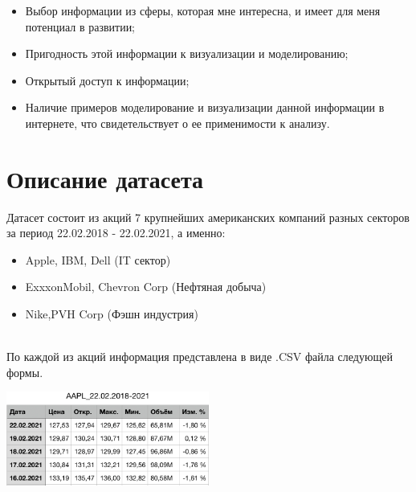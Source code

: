 \documentclass[12pt,a4paper]{article}
\begin{document}
\begin{minipage}{0.9\textwidth}
			\large
			\singlespacing 
            \begin{itemize}
            \item \normalsize Выбор информации из сферы, которая мне интересна, и имеет для меня потенциал в развитии;
            \item \normalsize Пригодность этой информации к визуализации и моделированию;
            \item \normalsize Открытый доступ к информации;
            \item \normalsize Наличие примеров моделирование и визуализации данной информации в интернете, что свидетельствует о ее применимости к анализу.
            \end{itemize}
\end{minipage}

\section{Описание датасета}

\large Датасет состоит из акций 7 крупнейших американских компаний разных секторов за период 22.02.2018 - 22.02.2021, а именно:

\begin{minipage}{0.9\textwidth}
			\large
			\singlespacing 
            \begin{itemize}
            \item \normalsize Apple, IBM, Dell (IT сектор)
            \item \normalsize ExxxonMobil, Chevron Corp (Нефтяная добыча)
            \item \normalsize Nike,PVH Corp (Фэшн индустрия)
            \end{itemize}
\end{minipage}\\[0.25cm]


\large По каждой из акций информация представлена в виде .CSV файла следующей формы.

\newpage

\begin{center}
    \includegraphics[width=0.5\textwidth]{StockApple.png}
\end{center}
\end{document}
